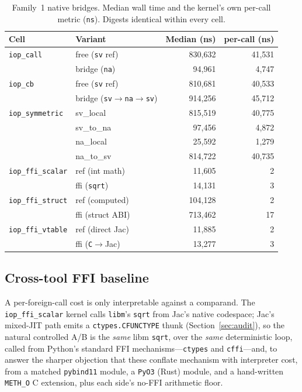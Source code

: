 \documentclass[conference]{IEEEtran}
\newcommand{\code}[1]{\texttt{#1}}
\begin{document}
\begin{table}[t]
\caption{Family~1 native bridges. Median wall time and the kernel's own
per-call metric (\code{ns}). Digests identical within every cell.}
\label{tab:bridges}
\centering
\small
\setlength{\tabcolsep}{4.5pt}
\begin{tabular}{@{}llrr@{}}
\toprule
Cell & Variant & Median (ns) & per-call (ns) \\
\midrule
\code{iop\_call} & free (\code{sv} ref) & 830{,}632 & 41{,}531 \\
                 & bridge (\code{na})   & 94{,}961  & 4{,}747 \\
\midrule
\code{iop\_cb}   & free (\code{sv} ref)        & 810{,}681 & 40{,}533 \\
                 & bridge (\code{sv}$\to$\code{na}$\to$\code{sv}) & 914{,}256 & 45{,}712 \\
\midrule
\code{iop\_symmetric} & sv\_local & 815{,}519 & 40{,}775 \\
                      & sv\_to\_na & 97{,}456 & 4{,}872 \\
                      & na\_local  & 25{,}592 & 1{,}279 \\
                      & na\_to\_sv & 814{,}722 & 40{,}735 \\
\midrule
\code{iop\_ffi\_scalar} & ref (int math)   & 11{,}605 & 2 \\
                        & ffi (\code{sqrt}) & 14{,}131 & 3 \\
\midrule
\code{iop\_ffi\_struct} & ref (computed)   & 104{,}128 & 2 \\
                        & ffi (struct ABI) & 713{,}462 & 17 \\
\midrule
\code{iop\_ffi\_vtable} & ref (direct Jac)      & 11{,}885 & 2 \\
                        & ffi (\code{C}$\to$Jac) & 13{,}277 & 3 \\
\bottomrule
\end{tabular}
\end{table}

\subsection{Cross-tool FFI baseline}
\label{sec:xtool}

A per-foreign-call cost is only interpretable against a comparand. The
\code{iop\_ffi\_scalar} kernel calls \code{libm}'s \code{sqrt} from Jac's native
codespace; Jac's mixed-JIT path emits a \code{ctypes.CFUNCTYPE} thunk
(Section~\ref{sec:audit}), so the natural controlled A/B is the \emph{same} libm
\code{sqrt}, over the \emph{same} deterministic loop, called from Python's
standard FFI mechanisms---\code{ctypes} and \code{cffi}---and, to answer the
sharper objection that these conflate mechanism with interpreter cost, from a
matched \code{pybind11} module, a \code{PyO3} (Rust) module, and a hand-written
\code{METH\_O} C extension, plus each side's no-FFI arithmetic floor.
\end{document}

